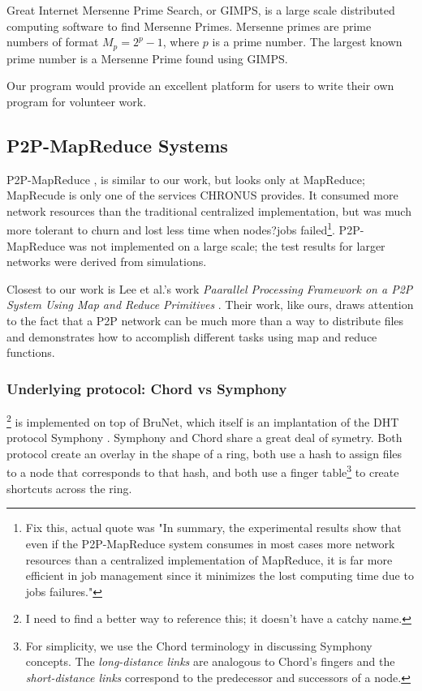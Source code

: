 \documentclass[conference, compsocconf, letterpaper]{IEEEtran}
\begin{document}
Great Internet  Mersenne Prime Search, or GIMPS, is a large scale distributed computing software to find Mersenne Primes.  Mersenne primes are prime numbers of format $M_{p} = 2^{p} - 1$, where $p$ is a prime number. The largest known prime number is a Mersenne Prime found using GIMPS.
 
 
Our program would provide an excellent platform for users to write their own program for volunteer work.  



\subsection{P2P-MapReduce Systems}

P2P-MapReduce \cite{marozzo2012p2p}, is similar to our work, but looks only at MapReduce; MapRecude is only one of the services CHRONUS provides.  It consumed more network resources than the traditional centralized implementation, but was much more tolerant to churn and lost less time when nodes?jobs failed\footnote{Fix this, actual quote was "In summary, the experimental results show that even if the P2P-MapReduce system consumes in most cases more network resources than a centralized implementation of MapReduce, it is far more efficient in job management since it minimizes the lost computing time due to jobs failures."}.  P2P-MapReduce was not implemented on a large scale; the test results for larger networks were derived from simulations.

Closest to our work is Lee et al.'s work \emph{Paarallel Processing Framework on a P2P System Using Map and Reduce Primitives} \cite{leemap}.  Their work, like ours, draws attention to the fact that a P2P network can be much more than a way to distribute files and demonstrates how to accomplish different tasks using map and reduce functions. 

\subsubsection{Underlying protocol: Chord vs Symphony}

\cite{leemap}\footnote{I need to find a better way to reference this; it doesn't have a  catchy name.} is implemented on top of BruNet\cite{BruNet}, which itself is an implantation of the DHT protocol Symphony \cite{symphony}.  Symphony and Chord share a great deal of symetry.  Both protocol create an overlay in the shape of a ring, both  use a hash to assign files to a node that corresponds to that hash, and both use a finger table\footnote{For simplicity, we use the Chord terminology in discussing Symphony concepts. The \emph{long-distance links} are analogous to Chord's fingers and the \emph{short-distance links} correspond to the predecessor and successors of a node.} to create shortcuts across the ring.
\end{document}
